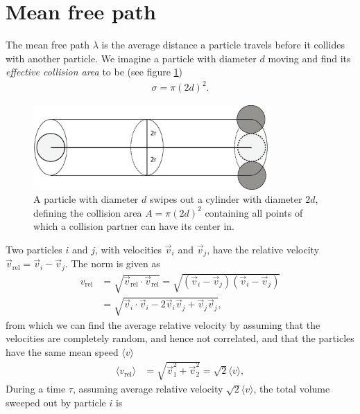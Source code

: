 \section{Mean free path}
\label{sec:mean_free_path_calculation}
The mean free path $\lambda$ is the average distance a particle travels before it collides with another particle. We imagine a particle with diameter $d$ moving and find its \textit{effective collision area} to be (see figure \ref{fig:effective_collision_area})
\begin{align}
	\sigma = \pi (2d)^2.
\end{align}
\begin{figure}[h]
\begin{center}
\includegraphics[width=0.8\textwidth, trim=0cm 0cm 0cm 0cm, clip]{DSMC/figures/effective_area2.eps}
\end{center}
\caption{A particle with diameter $d$ swipes out a cylinder with diameter $2d$, defining the collision area $A=\pi (2d)^2$ containing all points of which a collision partner can have its center in.}
\label{fig:effective_collision_area}
\end{figure}
Two particles $i$ and $j$, with velocities $\vec v_i$ and $\vec v_j$, have the relative velocity $\vec v_\text{rel} = \vec v_i - \vec v_j$. The norm is given as
\begin{align}
	v_\text{rel} &= \sqrt{\vec v_\text{rel}\cdot \vec v_\text{rel} } = \sqrt{ (\vec v_i - \vec v_j)(\vec v_i - \vec v_j)}\\
	&= \sqrt{\vec v_i\cdot \vec v_i - 2\vec v_i\vec v_j + \vec v_j\vec v_j},
\end{align}
from which we can find the average relative velocity by assuming that the velocities are completely random, and hence not correlated, and that the particles have the same mean speed $\langle v\rangle$
\begin{align}
	\langle v_\text{rel}\rangle &= \sqrt{\vec v_1^2 + \vec v_2^2} = \sqrt 2 \langle v\rangle,
\end{align}
During a time $\tau$, assuming average relative velocity $\sqrt 2 \langle v\rangle$, the total volume sweeped out by particle $i$ is 
